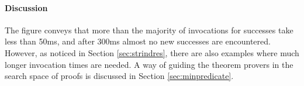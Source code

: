 \paragraph{Discussion}
The figure conveys that more than the majority of invocations for
successes take less than 50ms, and after 300ms almost no new successes
are encountered. However, as noticed in Section \ref{sec:strindres},
there are also examples where much longer invocation times are
needed. A way of guiding the theorem provers in the search space of
proofs is discussed in Section \ref{sec:minpredicate}.

\begin{comment}
The theorem provers are well suited for these kinds of problems, with
some variance already discussed. This motivates using automated
theorem provers to prove properties about Haskell programs. For the
specific setup, 5 seconds were used as timeout, but one second should
be sufficient, possibly less.
\end{comment}

